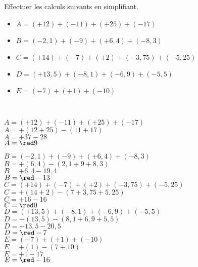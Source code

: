 \begin{exercice*}
   Effectuer les calculs suivants en simplifiant.
   \begin{itemize}
      \item[] $A =(+12) + (-11) + (+25) + (-17)$
      \item[] $B = (-2,1) + (-9) + (+6,4) + (-8,3)$
      \item[] $C = (+14) + (-7) + (+2) + (-3,75) + (-5,25)$
      \item[] $D = (+13,5) + (-8,1) + (-6,9) + (-5,5)$
      \item[] $E=(-7)+(+1)+(-10)$
   \end{itemize}
\end{exercice*}

\begin{corrige}
   \ \\   
   \begin{itemize}
      \def\item{}
      \item $A =(+12) + (-11) + (+25) + (-17)           $\\$A =+(12+25)-(11+17)     $\\$A =+37-28    $\\$A =\red 9$
   \end{itemize}
   \Coupe
   \begin{itemize}
      \def\item{}
      \item $B = (-2,1) + (-9) + (+6,4) + (-8,3)        $\\$B =+(6,4)-(2,1+9+8,3)   $\\$B =+6,4-19,4 $\\$B =\red -13$ \\\smallskip  
      \item $C = (+14) + (-7) + (+2) + (-3,75) + (-5,25)$\\$C =+(14+2)-(7+3,75+5,25)$\\$C =+16-16    $\\$C ={\red 0}$ \\\smallskip
      \item $D = (+13,5) + (-8,1) + (-6,9) + (-5,5)     $\\$D =+(13,5)-(8,1+6,9+5,5)$\\$D =+13,5-20,5$\\$D =\red -7$ \\\smallskip
      \item $E =(-7)+(+1)+(-10)                         $\\$E =+(1)-(7+10)          $\\$E =+1-17     $\\$E =\red -16$
   \end{itemize}
\end{corrige}

